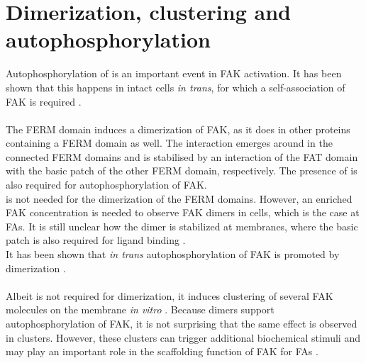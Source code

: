 \section{Dimerization, clustering and autophosphorylation}
\label{intro:clustering}
Autophosphorylation of  is an important event in FAK activation. It has been shown that this happens in intact cells \textit{in trans}, for which a self-association of FAK is required \autocite{transAuto}.\\
\\
The FERM domain induces a dimerization of FAK, as it does in other proteins containing a FERM domain as well. %
The interaction emerges around  in the connected FERM domains and is stabilised by an interaction of the FAT domain with the basic patch of the other FERM domain, respectively. The presence of  is also required for autophosphorylation of FAK.\\
\pip{} is not needed for the dimerization of the FERM domains. However, an enriched FAK concentration is needed to observe FAK dimers in cells, which is the case at FAs. It is still unclear how the dimer is stabilized at membranes, where the basic patch is also required for ligand binding \autocite{fakdimers}.\\
It has been shown that \textit{in trans} autophosphorylation of FAK is promoted by dimerization \autocite{dimersVsClusters}.\\
\\
Albeit \pip{} is not required for dimerization, it induces clustering of several FAK molecules on the membrane \textit{in vitro} \autocite{pap001}. Because dimers support autophosphorylation of FAK, it is not surprising that the same effect is observed in clusters. However, these clusters can trigger additional biochemical stimuli \autocite{dimersVsClusters} and may play an important role in the scaffolding function of FAK for FAs \autocite{pap001}.
